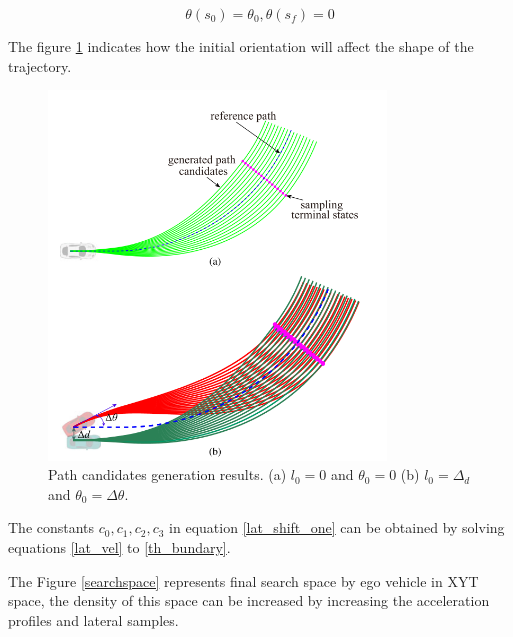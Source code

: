 \begin{equation}
\theta(s_0) = \theta_0 , \theta(s_f) = 0
\label{th_bundary}
\end{equation}

The figure \ref{lat_planning} indicates how the initial orientation will affect the shape of the trajectory. 

 \begin{figure}
    \centering
    \includegraphics[width=0.8\textwidth]{Images/lateral_planning.png}
    \caption{Path candidates generation results. (a) $l_0 = 0$ and $\theta_0 = 0$ (b) $ 
l_0 = \Delta_d$ and $ \theta_0 = \Delta\theta$. \cite{real_time_traj_plan_article}}
    \label{lat_planning}
\end{figure}



The constants $ { c_0,c_1,c_2,c_3}  $ in equation \ref{lat_shift_one} can be obtained by solving equations \ref{lat_vel} to \ref{th_bundary}.

The Figure \ref{searchspace} represents final search space by ego vehicle in XYT space, the density of this space can be increased by increasing the acceleration profiles and lateral samples. 

